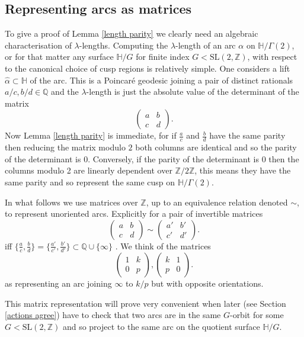 \documentclass[12pt,a4paper]{amsart}
\def\HH{\mathbb{H}}
\def\g2{\Gamma(2)}
\def\xx{\HH/\g2}
\def\ZZ{\mathbb{Z}}
\def\sl2{\mathrm{SL}(2, \ZZ)}
\begin{document}
\subsection{Representing arcs as matrices}
To give a proof of Lemma \ref{length parity}
we clearly need an algebraic characterisation of $\lambda$-lengths.
Computing the $\lambda$-length of an arc $\alpha$ on $\xx$, or for
that matter any surface $\mathbb{H}/G$ 
for finite index $G <  \sl2$,
with respect to the canonical choice of cusp regions
is relatively simple.
One considers a lift $\hat{\alpha}\subset \mathbb{H}$ of the arc.
This is a Poincaré geodesic joining a pair of distinct rationals
$a/c,b/d \in \mathbb{Q}$ and the $\lambda$-length is just
the absolute value of the determinant of the matrix
$$ 
 \begin{pmatrix} a & b \\ c & d \end{pmatrix}.
$$
Now Lemma \ref{length parity}
is immediate, for if $\frac{a}{c}$ and $\frac{b}{d}$
have the same parity then reducing the 
matrix modulo $2$ both columns are identical
and so the parity of the determinant is $0$.
Conversely, if the parity of the determinant is $0$
then the columns  modulo 2 are linearly dependent over
$\mathbb{Z}/2\mathbb{Z}$,
this means they have the same parity
and so represent the same cusp on $\xx$.

In what follows we use matrices over $\mathbb{Z}$,
up to an equivalence relation denoted $\sim$,
to represent unoriented arcs.
Explicitly  for a pair of invertible matrices 
$$ 
 \begin{pmatrix} a & b \\ c & d \end{pmatrix} \sim
 \begin{pmatrix} a' & b' \\ c' & d' \end{pmatrix}.
$$
iff $\{\frac{a}{c}, \frac{b}{d}\} = \{\frac{a'}{c'}, \frac{b'}{d'}\}
\subset \mathbb{Q}\cup \{\infty\}$
. 
We think of the matrices 
$$
 \begin{pmatrix} 1 & k \\ 0 & p \end{pmatrix},
 \begin{pmatrix} k & 1 \\ p  & 0 \end{pmatrix}.
$$
as representing an arc joining $\infty$ to $k/p$
but with opposite orientations.

This matrix representation will prove very convenient when later
(see Section \ref{actions agree})
have to check that two arcs are in the same $G$-orbit for some $G <
\sl2$ and so project to the same arc on the quotient surface
$\mathbb{H}/G$.
\end{document}
